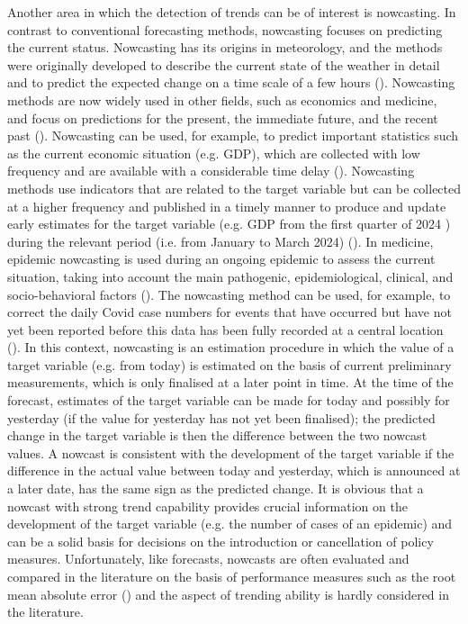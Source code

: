 Another area in which the detection of trends can be of interest is nowcasting.
In contrast to conventional forecasting methods, nowcasting focuses on predicting the current status.
Nowcasting has its origins in meteorology, and the methods were originally developed to describe the current state of the weather in detail and to predict the expected change on a time scale of a few hours (\cite{browning1989nowcasting,schmid2019nowcasting}).
Nowcasting methods are now widely used in other fields, such as economics and medicine, and focus on predictions for the present, the immediate future, and the recent past (\cite{banbura2013now, bok2018macroeconomic}).
Nowcasting can be used, for example, to predict important statistics such as the current economic situation (e.g. GDP), which are collected with low frequency and are available with a considerable time delay (\cite{banbura2013now}).
Nowcasting methods use indicators that are related to the target variable but can be collected at a higher frequency and published in a timely manner to produce and update early estimates for the target variable (e.g. GDP from the first quarter of 2024 ) during the relevant period (i.e. from January to March 2024) (\cite{castle2017forecasting}). 
In medicine, epidemic nowcasting is used during an ongoing epidemic to assess the current situation, taking into account the main pathogenic, epidemiological, clinical, and socio-behavioral factors (\cite{wu2021nowcasting}). 
The nowcasting method can be used, for example, to correct the daily Covid case numbers for events that have occurred but have not yet been reported before this data has been fully recorded at a central location (\cite{gunther2021nowcasting}). 
In this context, nowcasting is an estimation procedure in which the value of a target variable (e.g. from today) is estimated on the basis of current preliminary measurements, which is only finalised at a later point in time. 
At the time of the forecast, estimates of the target variable can be made for today and possibly for yesterday (if the value for yesterday has not yet been finalised); the predicted change in the target variable is then the difference between the two nowcast values. 
A nowcast is consistent with the development of the target variable if the difference in the actual value between today and yesterday, which is announced at a later date, has the same sign as the predicted change. 
It is obvious that a nowcast with strong trend capability provides crucial information on the development of the target variable (e.g. the number of cases of an epidemic) and can be a solid basis for decisions on the introduction or cancellation of policy measures. 
Unfortunately, like forecasts, nowcasts are often evaluated and compared in the literature on the basis of performance measures such as the root mean absolute error (\cite{gunther2021nowcasting}) and the aspect of trending ability is hardly considered in the literature. 


